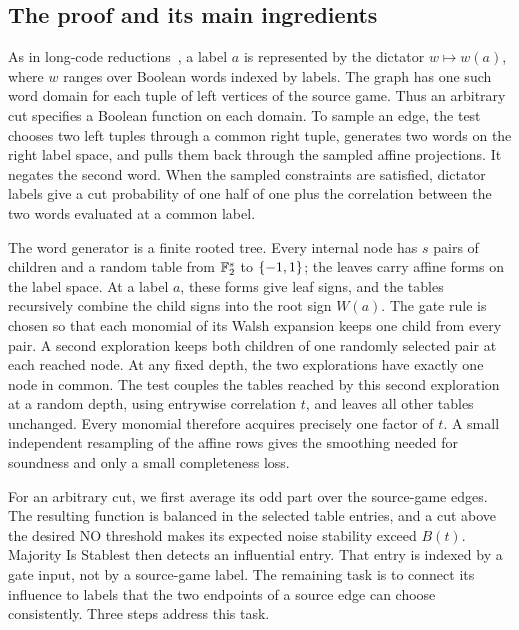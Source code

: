\subsection*{The proof and its main ingredients}

As in long-code reductions~\cite{BGS98,Hastad01}, a label $a$ is represented
by the dictator $w\mapsto w(a)$, where $w$ ranges over Boolean words
indexed by labels. The graph has one such word domain for each tuple of
left vertices of the source game. Thus an arbitrary cut specifies a
Boolean function on each domain. To sample an edge, the test chooses two
left tuples through a common right tuple, generates two words on the
right label space, and pulls them back through the sampled affine
projections. It negates the second word. When the sampled constraints
are satisfied, dictator labels give a cut probability of one half of one
plus the correlation between the two words evaluated at a common label.

The word generator is a finite rooted tree. Every internal node has $s$
pairs of children and a random table from $\mathbb F_2^s$ to $\{-1,1\}$; the leaves
carry affine forms on the label space. At a label $a$, these forms give
leaf signs, and the tables recursively combine the child signs into the
root sign $W(a)$. The gate rule is chosen so that each monomial of its
Walsh expansion keeps one child from every pair. A second exploration
keeps both children of one randomly selected pair at each reached node.
At any fixed depth, the two explorations have exactly one node in
common. The test couples the tables reached by this second exploration
at a random depth, using entrywise correlation $t$, and leaves all other
tables unchanged. Every monomial therefore acquires precisely one factor
of $t$. A small independent resampling of the affine rows gives the
smoothing needed for soundness and only a small completeness loss.

For an arbitrary cut, we first average its odd part over the source-game
edges. The resulting function is balanced in the selected table entries,
and a cut above the desired NO threshold makes its expected noise
stability exceed $B(t)$. Majority Is Stablest then detects an influential
entry. That entry is indexed by a gate input, not by a source-game label.
The remaining task is to connect its influence to labels that the two
endpoints of a source edge can choose consistently. Three steps address
this task.

